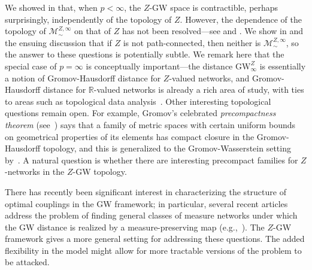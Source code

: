 \documentclass[twoside,11pt]{article}
\theoremstyle{definition}
\newcommand{\R}{\mathbb{R}}
\begin{document}
\smallskip
{} We showed in  that, when $p < \infty$, the $Z$-GW space is contractible, perhaps surprisingly, independently of the topology of $Z$. However, the dependence of the topology of $\mathcal{M}_\sim^{Z,\infty}$ on that of $Z$ has not been resolved---see  and . We show in  and the ensuing discussion that if $Z$ is not path-connected, then neither is $\mathcal{M}_\sim^{Z,\infty}$, so the answer to these questions is potentially subtle. We remark here that the special case of $p=\infty$ is conceptually important---the distance $\mathrm{GW}_\infty^Z$ is essentially a notion of Gromov-Hausdorff distance for $Z$-valued networks, and Gromov-Hausdorff distance for $\R$-valued networks is already a rich area of study, with ties to areas such as topological data analysis~\citep{chowdhury2018functorial,chowdhury2023distances}. Other interesting topological questions remain open. For example, Gromov's celebrated \emph{precompactness theorem} (see~\citealt[Chapter 7]{burago2022course}) says that a family of metric spaces with certain uniform bounds on geometrical properties of its elements has compact closure in the Gromov-Hausdorff topology, and this is generalized to the Gromov-Wasserstein setting by~\citet[Theorem 5.3]{memoli2011}. A natural question is whether there are interesting precompact families for $Z$-networks in the $Z$-GW topology.

\smallskip
{} There has recently been significant interest in characterizing the structure of optimal couplings in the GW framework; in particular, several recent articles address the problem of finding general classes of measure networks under which the GW distance is realized by a measure-preserving map (e.g.,~\citealt{memoli2022comparison,delon2022gromov,sturm2023space,dumont2024existence,clark2024generalized}). The $Z$-GW framework gives a more general setting for addressing these questions. The added flexibility in the model might allow for more tractable versions of the problem to be attacked. 
\end{document}
